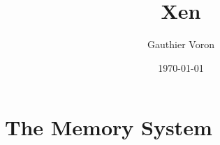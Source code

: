 \documentclass{book}
\title{Xen}
\date{\today}
\author{Gauthier Voron}
\begin{document}
\maketitle

\chapter{The Memory System}

\end{document}
